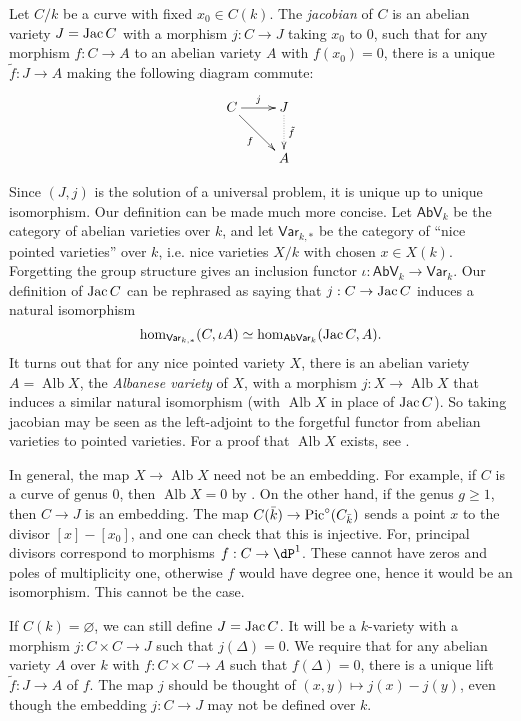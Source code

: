 \begin{definition}[Albanese]
Let $C/k$ be a curve with fixed $x_0\in C(k)$. The \emph{jacobian} of $C$ is 
an abelian variety $J=\operatorname{Jac} C$ with a morphism $j:C\to J$ taking $x_0$ to $0$, such 
that for any morphism $f:C\to A$ to an abelian variety $A$ with $f(x_0)=0$, 
there is a unique $\tilde f:J\to A$ making the following diagram commute:
\[\xymatrix{
  C \ar[r]^-j \ar[dr]_-f 
    & J \ar@{.>}[d]^-{\tilde f} \\
  & A
}\]
\end{definition}

Since $(J,j)$ is the solution of a universal problem, it is unique up to 
unique isomorphism. Our definition can be made much more concise. Let 
$\mathsf{AbV}_k$ be the category of abelian varieties over $k$, and let 
$\mathsf{Var}_{k,\ast}$ be the category of ``nice pointed varieties'' over $k$, 
i.e. nice varieties $X/k$ with chosen $x\in X(k)$. Forgetting the group 
structure gives an inclusion functor 
$\iota:\mathsf{AbV}_k\to \mathsf{Var}_k$. Our definition of $\operatorname{Jac} C$ can be 
rephrased as saying that $j:C\to \operatorname{Jac} C$ induces a natural isomorphism 
\[
  \hom_{\mathsf{Var}_{k,\ast}}(C,\iota A) \simeq \hom_{\mathsf{AbVar}_k}(\operatorname{Jac} C,A)\text{.}
\]
It turns out that for any nice pointed variety $X$, there is an abelian variety 
$A=\operatorname{Alb} X$, the \emph{Albanese variety} of $X$, with a morphism 
$j:X\to \operatorname{Alb} X$ that induces a similar natural isomorphism (with 
$\operatorname{Alb} X$ in place of $\operatorname{Jac} C$). So taking jacobian may be seen 
as the left-adjoint to the forgetful functor from abelian varieties to pointed 
varieties. For a proof that $\operatorname{Alb} X$ exists, see 
\cite[A.11]{mo12}.

In general, the map $X\to \operatorname{Alb} X$ need not be an embedding. 
For example, if $C$ is a curve of genus $0$, then $\operatorname{Alb} X=0$ by 
\cite[I.3.9]{mi-av}. On the other hand, if the genus $g\geqslant 1$, then 
$C\to J$ is an embedding. The map $C(\bar k)\to \operatorname{Pic}^\circ(C_{\bar k})$ sends 
a point $x$ to the divisor $[x]-[x_0]$, and one can check that this is 
injective. For, principal divisors correspond to morphisms 
$f:C\to\dP^1$. These cannot have zeros and poles of multiplicity one, 
otherwise $f$ would have degree one, hence it would be an isomorphism. This 
cannot be the case. 

If $C(k)=\varnothing$, we can still define $J=\operatorname{Jac} C$. It will be a $k$-variety 
with a morphism $j:C\times C\to J$ such that $j(\Delta)=0$. We require 
that for any abelian variety $A$ over $k$ with $f:C\times C\to A$ such that 
$f(\Delta)=0$, there is a unique lift $\tilde f:J\to A$ of $f$. The map $j$ 
should be thought of $(x,y)\mapsto j(x)-j(y)$, even though the embedding 
$j:C\to J$ may not be defined over $k$. 





